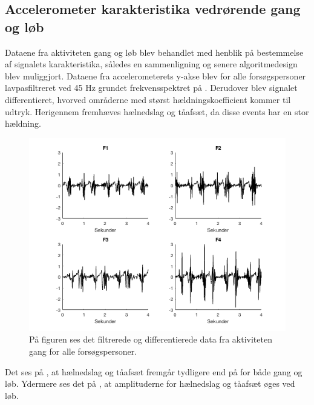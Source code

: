 \subsection{Accelerometer karakteristika vedrørende gang og løb}
Dataene fra aktiviteten gang og løb blev behandlet med henblik på bestemmelse af signalets karakteristika, således en sammenligning og senere algoritmedesign blev muliggjort. Dataene fra accelerometerets y-akse blev for alle forsøgspersoner lavpasfiltreret ved 45 Hz grundet frekvensspektret på . Derudover blev signalet differentieret, hvorved områderne med størst hældningskoefficient kommer til udtryk. Herigennem fremhæves hælnedslag og tåafsæt, da disse events har en stor hældning.
\begin{figure}[H]
	\centering
	\includegraphics[scale=0.6]{figures/qBilag/gang_diff}
	\caption{På figuren ses det filtrerede og differentierede data fra aktiviteten gang for alle forsøgspersoner.}
	\label{fig:Ap_gangdiff}
\end{figure}\vspace{-.25cm}
Det ses på , at hælnedslag og tåafsæt fremgår tydligere end på  for både gang og løb. Ydermere ses det på , at amplituderne for hælnedslag og tåafsæt øges ved løb.
